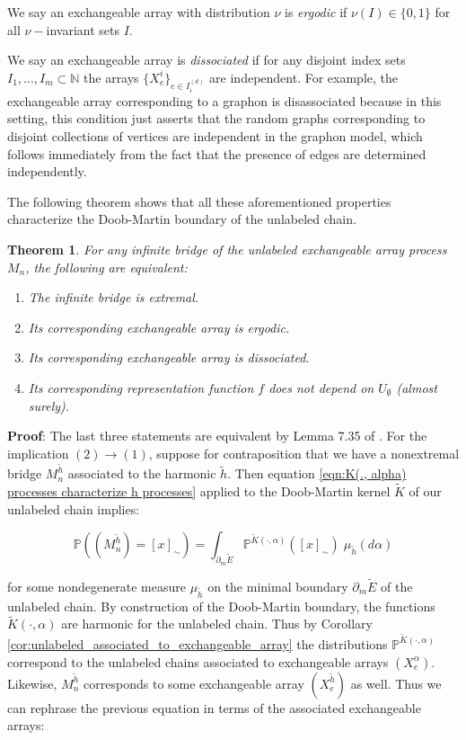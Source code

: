 \documentclass[11pt,oneside,reqno]{article}
\theoremstyle{plain}
\newtheorem{theorem}{Theorem}[section]
\theoremstyle{definition}
\numberwithin{equation}{section}
\renewcommand{\cite}{\citet}
\newcommand{\N}{\mathbb{N}}
\renewcommand{\P}{\mathbb{P}}
\begin{document}
We say an exchangeable array with distribution $\nu$ is \textit{ergodic} if $\nu(I) \in \{0,1\}$ for all $\nu-$invariant sets $I$. 

 We say an exchangeable array is \textit{dissociated} if for any disjoint index sets $I_1,...,I_m \subset \N$ the arrays $\{X^i_e\}_{e \in I_i^{(d)}}$ are independent. For example, the exchangeable array corresponding to a graphon is disassociated because in this setting, this condition just asserts that the random  graphs corresponding to disjoint collections of vertices are independent in the graphon model, which follows immediately from the fact that the presence of edges are determined independently.

 The following theorem shows that all these aforementioned properties characterize the Doob-Martin boundary of the unlabeled chain.

\begin{theorem}
    For any infinite bridge of the unlabeled exchangeable array process $M_n$, the following are equivalent:

    \begin{enumerate}
        \item The infinite bridge is extremal.
        \item Its corresponding exchangeable array is ergodic.
        \item Its corresponding exchangeable array is dissociated.
        \item Its corresponding representation function $f$ does not depend on $U_\emptyset$ (almost surely). 
    \end{enumerate}
    \label{thm:boundary_is_ergodic_arrays}
\end{theorem}



\noindent \textbf{Proof}: The last three statements are equivalent by Lemma 7.35 of \cite{KallenbergProbabilisticSymmetries}. For the implication $(2) \to  (1)$, suppose for contraposition that we have a nonextremal bridge $M_n^{\tilde{h}}$ associated to the harmonic $\tilde{h}$. Then equation \eqref{eqn:K(., alpha) processes characterize h processes} applied to the Doob-Martin kernel $\tilde{K}$ of our unlabeled chain implies:

\[\P((M_n^{\tilde{h}}) = [x]_\sim) = \int_{\partial_m \tilde{E}} \P^{\tilde{K}(\cdot, \alpha)}([x]_\sim) \; \mu_{\tilde{h}}(d\alpha)\]

\noindent for some nondegenerate measure $\mu_{\tilde{h}}$ on the minimal boundary $\partial_m \tilde{E}$ of the unlabeled chain. By construction of the Doob-Martin boundary, the functions $\tilde{K}(\cdot, \alpha)$ are harmonic for the unlabeled chain. Thus by Corollary \ref{cor:unlabeled_associated_to_exchangeable_array} the distributions $\P^{\tilde{K}(\cdot, \alpha)}$ correspond to the unlabeled chains associated to exchangeable arrays $(X^\alpha_e)$. Likewise, $M_n^{\tilde{h}}$ corresponds to some exchangeable array $(X_e^{\tilde{h}})$ as well. Thus we can rephrase the previous equation in terms of the associated exchangeable arrays:
\end{document}
